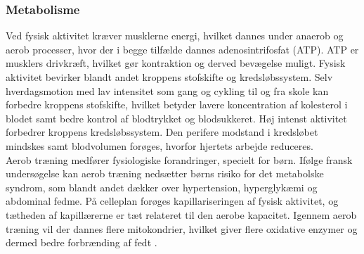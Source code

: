 \subsubsection{Metabolisme}\label{subsub:metab}
Ved fysisk aktivitet kræver musklerne energi, hvilket dannes under anaerob og aerob processer, hvor der i begge tilfælde dannes adenosintrifosfat (ATP). ATP er musklers drivkræft, hvilket gør kontraktion og derved bevægelse muligt. Fysisk aktivitet bevirker blandt andet kroppens stofskifte og kredsløbssystem. Selv hverdagsmotion med lav intensitet som gang og cykling til og fra skole kan forbedre kroppens stofskifte, hvilket betyder lavere koncentration af kolesterol i blodet samt bedre kontrol af blodtrykket og blodsukkeret. Høj intenst aktivitet forbedrer kroppens kredsløbssystem. Den perifere modstand i kredsløbet mindskes samt blodvolumen forøges, hvorfor hjertets arbejde reduceres. \citep{Martini2012,Kiens2007,Sundhedsstyrelsen2001} \\
Aerob træning medfører fysiologiske forandringer, specielt for børn. Ifølge fransk undersøgelse kan aerob træning nedsætter børns risiko for det metabolske syndrom, som blandt andet dækker over hypertension, hyperglykæmi og abdominal fedme. På celleplan forøges kapillariseringen af fysisk aktivitet, og tætheden af kapillærerne er tæt relateret til den aerobe kapacitet. \citep{Sundhedsstyrelsen2001,Guinhouya2009} Igennem aerob træning vil der dannes flere mitokondrier, hvilket giver flere oxidative enzymer og dermed bedre forbrænding af fedt \citep{Sundhedsstyrelsen2001}.